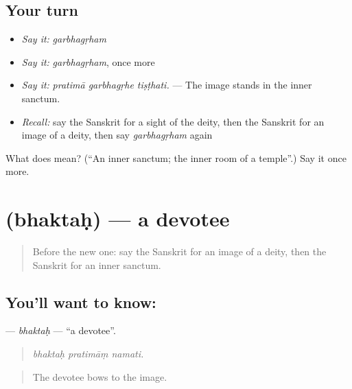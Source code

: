 \subsection*{Your turn}
\begin{itemize}
\raggedright
  \item \emph{Say it:} \emph{garbhagṛham}
  \item \emph{Say it:} \emph{garbhagṛham}, once more
  \item \emph{Say it:} \emph{pratimā garbhagṛhe tiṣṭhati.} — The image stands in the inner sanctum.
  \item \emph{Recall:} say the Sanskrit for a sight of the deity, then the Sanskrit for an image of a deity, then say \emph{garbhagṛham} again
\end{itemize}

\begin{tcolorbox}[breakable,colback=teal!4,colframe=teal!35!black,title={Before you move on}]
What does  mean? (\textquotedblleft{}An inner sanctum; the inner room of a temple\textquotedblright{}.) Say it once more.
\end{tcolorbox}
\section[\texorpdfstring{\sk{भक्तः} (bhaktaḥ)}{भक्तः (bhaktaḥ)}]{ (bhaktaḥ) — a devotee}

\label{lesson:SA-C396-bhaktah}



\begin{quote}
Before the new one: say the Sanskrit for an image of a deity, then the Sanskrit for an inner sanctum.
\end{quote}

\subsection*{You'll want to know: }
\textbf{} — \emph{bhaktaḥ} — \textquotedblleft{}a devotee\textquotedblright{}.

\begin{quote}
  
\end{quote}

\begin{quote}
\emph{bhaktaḥ pratimāṃ namati.}
\end{quote}

\begin{quote}
The devotee bows to the image.
\end{quote}

